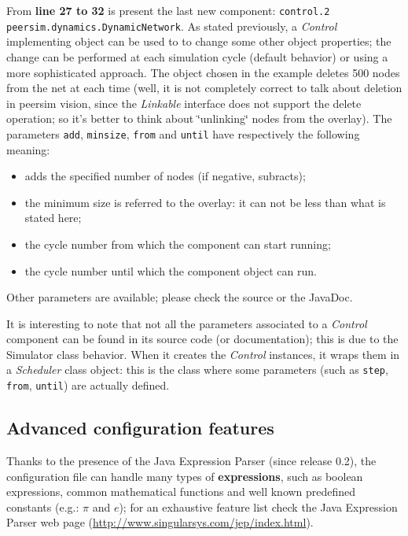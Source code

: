 \documentclass[a4paper,11pt]{article}
\begin{document}
From \textbf{line 27 to 32} is present the last new component: 
\texttt{control.2
peersim.dynamics.DynamicNetwork}. As stated previously, a \emph{Control}
implementing object can be used to to change some other object
properties; the change can be performed at each simulation cycle (default
behavior) or using a more sophisticated approach. The object chosen
in the example deletes 500 nodes from the net at each time (well,
it is not completely correct to talk about deletion in peersim vision,
since the \emph{Linkable} interface does not support the delete
operation; so it's better to think about \char`\"{}unlinking\char`\"{} 
nodes from the overlay). The parameters \texttt{add}, \texttt{minsize},
\texttt{from} and \texttt{until} have respectively the following meaning:

\begin{itemize}
\item adds the specified number of nodes (if negative, subracts);
\item the minimum size is referred to the overlay: it can not be less than
what is stated here;
\item the cycle number from which the component can start running;
\item the cycle number until which the component object can run.
\end{itemize}

Other parameters are available; please check the source or the JavaDoc.

It is interesting to note that not all the parameters associated to
a \emph{Control} component can be found in its source code (or
documentation); this is due to the Simulator class 
behavior. When it creates the \emph{Control} instances, it
wraps them in a \emph{Scheduler} class object: this is the class where
some parameters (such as \texttt{step}, \texttt{from}, \texttt{until})
are actually defined.

\subsection{Advanced configuration features}

Thanks to the presence of the Java Expression Parser (since release
0.2), the configuration
file can handle many types of \textbf{expressions}, such as boolean 
expressions, common mathematical functions and well known predefined
constants (e.g.: $\pi$ and $e$); for an exhaustive feature list check
the Java Expression Parser web page
(\url{http://www.singularsys.com/jep/index.html}).
\end{document}

